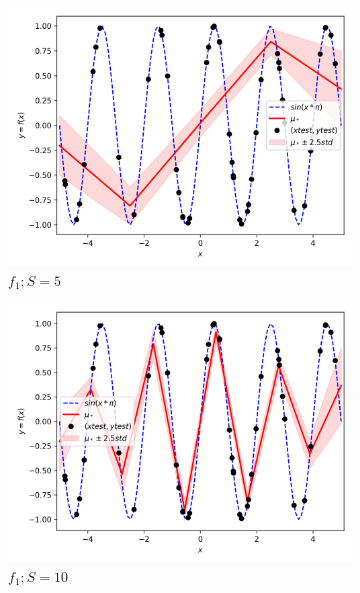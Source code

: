 \documentclass{article}
\begin{document}
\begin{figure}
  \begin{subfigure}{.33\textwidth}
    \centering
    \includegraphics[width=\linewidth]{test_size/func1_5.png}
    \caption{$f_1; S = 5$}
  \end{subfigure}
  \begin{subfigure}{.33\textwidth}
    \centering
    \includegraphics[width=\linewidth]{test_size/func1_10.png}
    \caption{$f_1; S = 10$}
  \end{subfigure}
  \begin{subfigure}{.33\textwidth}
    \centering

\end{subfigure}
\end{figure}
\end{document}

